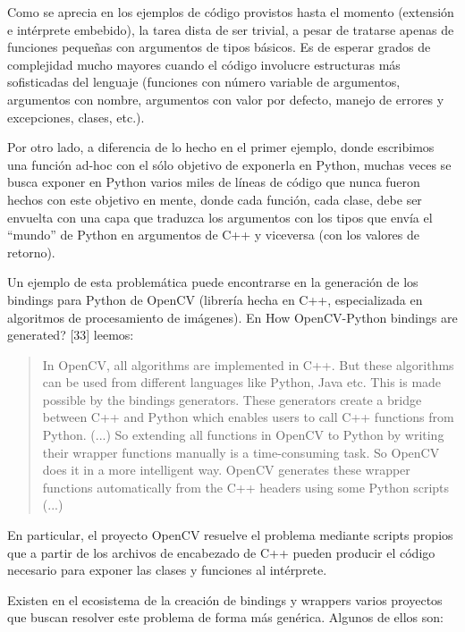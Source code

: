 Como se aprecia en los ejemplos de código provistos hasta el momento (extensión
e intérprete embebido), la tarea dista de ser trivial, a pesar de tratarse
apenas de funciones pequeñas con argumentos de tipos básicos. Es de esperar
grados de complejidad mucho mayores cuando el código involucre estructuras más
sofisticadas del lenguaje (funciones con número variable de argumentos,
argumentos con nombre, argumentos con valor por defecto, manejo de errores y
excepciones, clases, etc.).

Por otro lado, a diferencia de lo hecho en el primer ejemplo, donde escribimos
una función ad-hoc con el sólo objetivo de exponerla en Python, muchas veces se
busca exponer en Python varios miles de líneas de código que nunca fueron
hechos con este objetivo en mente, donde cada función, cada clase, debe ser
envuelta con una capa que traduzca los argumentos con los tipos que envía el
``mundo'' de Python en argumentos de C++ y viceversa (con los valores de
retorno).

Un ejemplo de esta problemática puede encontrarse en la generación de los
bindings para Python de OpenCV (librería hecha en C++, especializada en
algoritmos de procesamiento de imágenes). En How OpenCV-Python bindings are
generated? [33] leemos:

\begin{quotation}
In OpenCV, all algorithms are implemented in C++. But these algorithms can be
used from different languages like Python, Java etc. This is made possible by
the bindings generators. These generators create a bridge between C++ and
Python which enables users to call C++ functions from Python. (...)  So
extending all functions in OpenCV to Python by writing their wrapper functions
manually is a time-consuming task. So OpenCV does it in a more intelligent way.
OpenCV generates these wrapper functions automatically from the C++ headers
using some Python scripts (...)
\end{quotation}

En particular, el proyecto OpenCV resuelve el problema mediante scripts propios
que a partir de los archivos de encabezado de C++ pueden producir el código
necesario para exponer las clases y funciones al intérprete. 

Existen en el ecosistema de la creación de bindings y wrappers varios proyectos
que buscan resolver este problema de forma más genérica. Algunos de ellos son:

